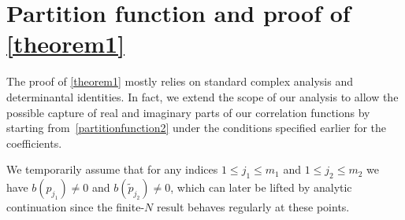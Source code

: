 \documentclass[pdflatex,sn-mathphys-num]{sn-jnl}
\theoremstyle{thmstyleone}
\numberwithin{equation}{section}
\begin{document}
\section{Partition function and proof of \autoref{theorem1}}\label{sec1}


The proof of \autoref{theorem1} mostly relies on standard complex analysis and determinantal identities. In fact, we extend the scope of our analysis to allow the possible capture of real and imaginary parts of our correlation functions by starting from~\eqref{partitionfunction2} under the conditions specified earlier for the coefficients.

We temporarily assume that for any indices $1\leq j_{1}\leq m_{1}$ and $1\leq j_{2}\leq m_{2}$ we have $b(p_{j_{1}})\neq 0$ and $b(\widetilde{p}_{j_{2}})\neq 0$, which can later be lifted by analytic continuation since the finite-$N$ result behaves regularly at these points.
\end{document}
